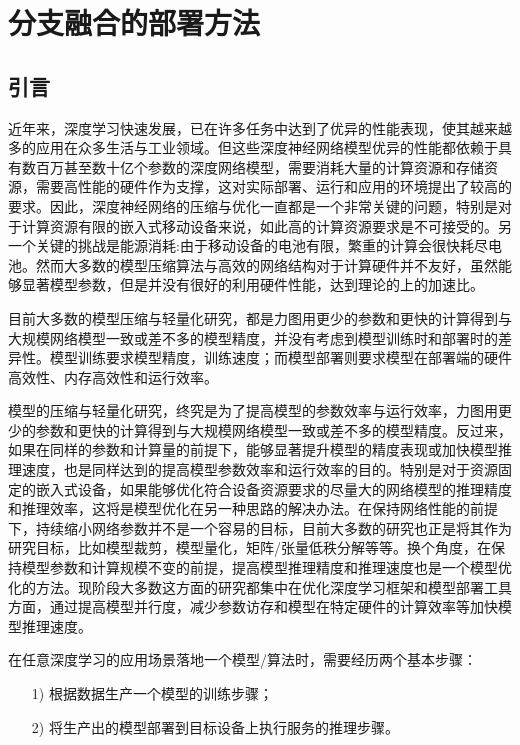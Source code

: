 
\chapter{分支融合的部署方法}

\section{引言}

近年来，深度学习快速发展，已在许多任务中达到了优异的性能表现，使其越来越多的应用在众多生活与工业领域。但这些深度神经网络模型优异的性能都依赖于具有数百万甚至数十亿个参数的深度网络模型，需要消耗大量的计算资源和存储资源，需要高性能的硬件作为支撑，这对实际部署、运行和应用的环境提出了较高的要求。因此，深度神经网络的压缩与优化一直都是一个非常关键的问题，特别是对于计算资源有限的嵌入式移动设备来说，如此高的计算资源要求是不可接受的。另一个关键的挑战是能源消耗:由于移动设备的电池有限，繁重的计算会很快耗尽电池。然而大多数的模型压缩算法与高效的网络结构对于计算硬件并不友好，虽然能够显著模型参数，但是并没有很好的利用硬件性能，达到理论的上的加速比。

目前大多数的模型压缩与轻量化研究，都是力图用更少的参数和更快的计算得到与大规模网络模型一致或差不多的模型精度，并没有考虑到模型训练时和部署时的差异性。模型训练要求模型精度，训练速度；而模型部署则要求模型在部署端的硬件高效性、内存高效性和运行效率。

模型的压缩与轻量化研究，终究是为了提高模型的参数效率与运行效率，力图用更少的参数和更快的计算得到与大规模网络模型一致或差不多的模型精度。反过来，如果在同样的参数和计算量的前提下，能够显著提升模型的精度表现或加快模型推理速度，也是同样达到的提高模型参数效率和运行效率的目的。特别是对于资源固定的嵌入式设备，如果能够优化符合设备资源要求的尽量大的网络模型的推理精度和推理效率，这将是模型优化在另一种思路的解决办法。在保持网络性能的前提下，持续缩小网络参数并不是一个容易的目标，目前大多数的研究也正是将其作为研究目标，比如模型裁剪，模型量化，矩阵/张量低秩分解等等。换个角度，在保持模型参数和计算规模不变的前提，提高模型推理精度和推理速度也是一个模型优化的方法。现阶段大多数这方面的研究都集中在优化深度学习框架和模型部署工具方面，通过提高模型并行度，减少参数访存和模型在特定硬件的计算效率等加快模型推理速度。

在任意深度学习的应用场景落地一个模型/算法时，需要经历两个基本步骤：
\begin{itemize}
    \item[1)] 根据数据生产一个模型的训练步骤；
    \item[2)] 将生产出的模型部署到目标设备上执行服务的推理步骤。
\end{itemize}

